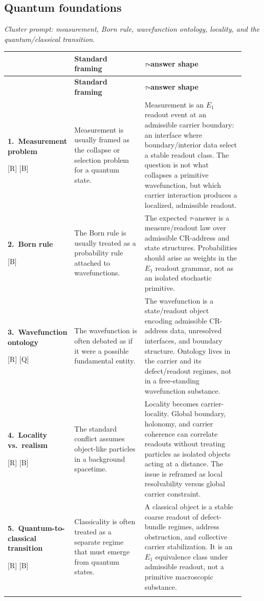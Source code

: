 \documentclass{pantarhei-researchnote}
\makeatletter
\newcommand{\Rtag}{\textcolor{pr-lane-verify}{\textsc{[R]}}}
\newcommand{\Btag}{\textcolor{pr-lane-results}{\textsc{[B]}}}
\newcommand{\Qtag}{\textcolor{pr-lane-discover}{\textsc{[Q]}}}
\newcommand{\ledgerprompt}[1]{%
  \par\smallskip
  {\small\itshape\color{pr-ink-600}#1\par}
  \vspace{0.35em}
}
\newcommand{\ledgerrow}[5]{%
  \textbf{#1.\ #2}\par{\scriptsize\sffamily #5} &
  #3 &
  #4 \\
  \addlinespace[0.35em]
}
\newenvironment{clusterledger}{%
  \renewcommand{\arraystretch}{1.18}%
  \footnotesize
  \begin{longtable}{@{}>{\RaggedRight\arraybackslash}p{0.19\linewidth}%
    >{\RaggedRight\arraybackslash}p{0.30\linewidth}%
    >{\RaggedRight\arraybackslash}p{0.43\linewidth}@{}}
  \toprule
  {\sffamily\bfseries\color{pr-brand-700}Question} &
  {\sffamily\bfseries\color{pr-brand-700}Standard framing} &
  {\sffamily\bfseries\color{pr-brand-700}\(\tau\)-answer shape} \\
  \midrule
  \endfirsthead
  \toprule
  {\sffamily\bfseries\color{pr-brand-700}Question} &
  {\sffamily\bfseries\color{pr-brand-700}Standard framing} &
  {\sffamily\bfseries\color{pr-brand-700}\(\tau\)-answer shape} \\
  \midrule
  \endhead
}{%
  \bottomrule
  \end{longtable}
  \normalsize
}
\makeatother
\begin{document}
\subsection{Quantum foundations}
\ledgerprompt{Cluster prompt: measurement, Born rule, wavefunction ontology,
locality, and the quantum/classical transition.}
\begin{clusterledger}
\ledgerrow{1}{Measurement problem}
{Measurement is usually framed as the collapse or selection problem for a
quantum state.}
{Measurement is an \(E_1\) readout event at an admissible carrier boundary:
an interface where boundary/interior data select a stable readout class. The
question is not what collapses a primitive wavefunction, but which carrier
interaction produces a localized, admissible readout.}
{\Rtag{} \Btag}
\ledgerrow{2}{Born rule}
{The Born rule is usually treated as a probability rule attached to
wavefunctions.}
{The expected \(\tau\)-answer is a measure/readout law over admissible
CR-address and state structures. Probabilities should arise as weights in the
\(E_1\) readout grammar, not as an isolated stochastic primitive.}
{\Btag}
\ledgerrow{3}{Wavefunction ontology}
{The wavefunction is often debated as if it were a possible fundamental
entity.}
{The wavefunction is a state/readout object encoding admissible CR-address
data, unresolved interfaces, and boundary structure. Ontology lives in the
carrier and its defect/readout regimes, not in a free-standing wavefunction
substance.}
{\Rtag{} \Qtag}
\ledgerrow{4}{Locality vs.\ realism}
{The standard conflict assumes object-like particles in a background
spacetime.}
{Locality becomes carrier-locality. Global boundary, holonomy, and carrier
coherence can correlate readouts without treating particles as isolated
objects acting at a distance. The issue is reframed as local resolvability
versus global carrier constraint.}
{\Rtag{} \Btag}
\ledgerrow{5}{Quantum-to-classical transition}
{Classicality is often treated as a separate regime that must emerge from
quantum states.}
{A classical object is a stable coarse readout of defect-bundle regimes,
address obstruction, and collective carrier stabilization. It is an \(E_1\)
equivalence class under admissible readout, not a primitive macroscopic
substance.}
{\Rtag{} \Btag}
\end{clusterledger}
\end{document}
